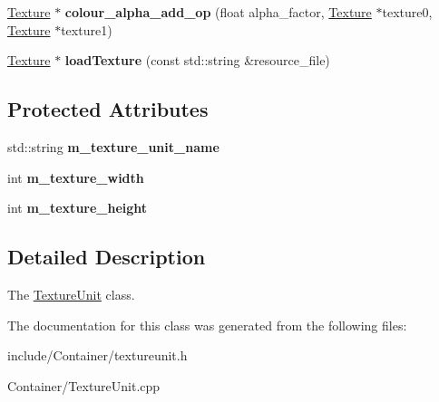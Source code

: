 \begin{DoxyCompactItemize}
\item 
\hypertarget{classEngine_1_1TextureUnit_af01babc9b8bb462c9469a07e6f386818}{}\hyperlink{classEngine_1_1Texture}{Texture} $\ast$ {\bfseries colour\+\_\+alpha\+\_\+add\+\_\+op} (float alpha\+\_\+factor, \hyperlink{classEngine_1_1Texture}{Texture} $\ast$texture0, \hyperlink{classEngine_1_1Texture}{Texture} $\ast$texture1)\label{classEngine_1_1TextureUnit_af01babc9b8bb462c9469a07e6f386818}

\item 
\hypertarget{classEngine_1_1TextureUnit_acec8b2a51920491ea4497792b7b0278c}{}\hyperlink{classEngine_1_1Texture}{Texture} $\ast$ {\bfseries load\+Texture} (const std\+::string \&resource\+\_\+file)\label{classEngine_1_1TextureUnit_acec8b2a51920491ea4497792b7b0278c}

\end{DoxyCompactItemize}
\subsection*{Protected Attributes}
\begin{DoxyCompactItemize}
\item 
\hypertarget{classEngine_1_1TextureUnit_a41c1d058b5726a89b80d687e9e8c6eea}{}std\+::string {\bfseries m\+\_\+texture\+\_\+unit\+\_\+name}\label{classEngine_1_1TextureUnit_a41c1d058b5726a89b80d687e9e8c6eea}

\item 
\hypertarget{classEngine_1_1TextureUnit_a32f88e60525df0b7e402c739564c4f11}{}int {\bfseries m\+\_\+texture\+\_\+width}\label{classEngine_1_1TextureUnit_a32f88e60525df0b7e402c739564c4f11}

\item 
\hypertarget{classEngine_1_1TextureUnit_a8c8a80f18d8c3e482a0282bb16214bfd}{}int {\bfseries m\+\_\+texture\+\_\+height}\label{classEngine_1_1TextureUnit_a8c8a80f18d8c3e482a0282bb16214bfd}

\end{DoxyCompactItemize}


\subsection{Detailed Description}
The \hyperlink{classEngine_1_1TextureUnit}{Texture\+Unit} class. 

The documentation for this class was generated from the following files\+:\begin{DoxyCompactItemize}
\item 
include/\+Container/textureunit.\+h\item 
Container/Texture\+Unit.\+cpp\end{DoxyCompactItemize}
